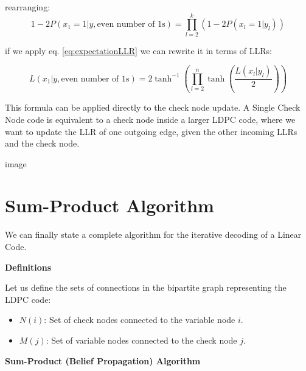 rearranging:
\begin{equation}
	1 -2P( x_1=1|y, \text{even number of 1s}) = \prod_{l=2}^{k}(1 - 2P(x_l=1|y_l))
\end{equation}

if we apply eq. \ref{eq:expectationLLR} we can rewrite it in terms of LLRs:

\begin{equation}
	L(x_1|y, \text{even number of 1s}) = 2\tanh^{-1} \left(\prod_{l=2}^n\tanh\left( \frac{L(x_l|y_l)}{2}\right)\right)
\end{equation}


This formula can be applied directly to the check node update. A Single Check Node code is equivalent to a check node inside a larger LDPC code, where we want to update the LLR of one outgoing edge, given the other incoming LLRs and the check node. 

image

\newpage
\section{Sum-Product Algorithm}

We can finally state a complete algorithm for the iterative decoding of a Linear Code. 
\vspace{1em}

\textbf{Definitions}

Let us define the sets of connections in the bipartite graph representing the LDPC code:

\begin{itemize}
    \item $N(i)$: Set of check nodes connected to the variable node $i$.
    \item $M(j)$: Set of variable nodes connected to the check node $j$.
\end{itemize}

\vspace{1em}

\textbf{Sum-Product (Belief Propagation) Algorithm}

